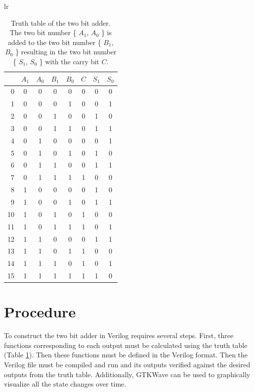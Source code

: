 \documentclass[12pt]{article}
\begin{document}
\begin{table}[hbp]
\begin{center}
\begin{tabular}{lr}
\begin{tabular}[t]{r|cccc|ccc}
 & $A_1$ & $A_0$ & $B_1$ & $B_0$ & $C$ & $S_1$ & $S_0$ \\
\hline
0  & 0 & 0 & 0 & 0 & 0 & 0 & 0\\
1  & 0 & 0 & 0 & 1 & 0 & 0 & 1\\
2  & 0 & 0 & 1 & 0 & 0 & 1 & 0\\
3  & 0 & 0 & 1 & 1 & 0 & 1 & 1\\
4  & 0 & 1 & 0 & 0 & 0 & 0 & 1\\
5  & 0 & 1 & 0 & 1 & 0 & 1 & 0\\
6  & 0 & 1 & 1 & 0 & 0 & 1 & 1\\
7  & 0 & 1 & 1 & 1 & 1 & 0 & 0\\
8  & 1 & 0 & 0 & 0 & 0 & 1 & 0\\
9  & 1 & 0 & 0 & 1 & 0 & 1 & 1\\
10 & 1 & 0 & 1 & 0 & 1 & 0 & 0\\
11 & 1 & 0 & 1 & 1 & 1 & 0 & 1\\
12 & 1 & 1 & 0 & 0 & 0 & 1 & 1\\
13 & 1 & 1 & 0 & 1 & 1 & 0 & 0\\
14 & 1 & 1 & 1 & 0 & 1 & 0 & 1\\
15 & 1 & 1 & 1 & 1 & 1 & 1 & 0\\
\end{tabular}
\end{tabular}
\end{center}
\caption{Truth table of the two bit adder.  The two bit number \{ $A_1$, $A_0$ \}
is added to the two bit number \{ $B_1$, $B_0$ \} resulting in the two bit number
\{ $S_1$, $S_0$ \} with the carry bit $C$.}
\label{tbl:tt}
\end{table}


\section{Procedure}
\label{sec:procedure}

To construct the two bit adder in Verilog requires several steps.
First, three functions corresponding to each output must be
calculated using the truth table (Table \ref{tbl:tt}).
Then these functions must be defined in the Verilog format.
Then the Verilog file must be compiled and run and its outputs
verified against the desired outputs from the truth table.
Additionally, GTKWave can be used to graphically visualize all the
state changes over time.
\end{document}

